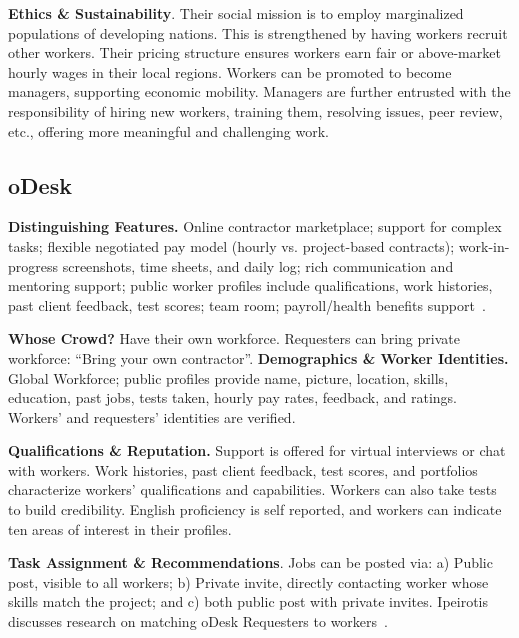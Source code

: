 \documentclass{sigchi}
\begin{document}
{\bf Ethics \& Sustainability}. Their social mission is to employ marginalized populations of developing nations. This is strengthened by having workers recruit other workers. Their pricing structure ensures workers earn fair or above-market hourly wages in their local regions. Workers can be promoted to become managers, supporting economic mobility. Managers are further entrusted with the responsibility of hiring new workers, training them, resolving issues, peer review, etc., offering more meaningful and challenging work.

\subsection{oDesk} 

{\bf Distinguishing Features.} Online contractor marketplace; support for complex tasks; flexible negotiated pay model (hourly vs. project-based contracts); work-in-progress screenshots, time sheets, and daily log; rich communication and mentoring support; public worker profiles include qualifications, work histories, past client feedback, test scores; team room; payroll/health benefits support~\cite{Ipeirotis-odesk}.

{\bf Whose Crowd?} Have their own workforce. Requesters can bring private workforce: ``Bring your own contractor''.
{\bf Demographics \& Worker Identities.} Global Workforce; public profiles provide name, picture, location, skills, education, past jobs, tests taken, hourly pay rates, feedback, and ratings. Workers' and requesters' identities are verified. 

{\bf Qualifications \& Reputation.} Support is offered for virtual interviews or chat with workers. Work histories, past client feedback, test scores, and portfolios characterize workers' qualifications and capabilities. Workers can also take tests to build credibility. English proficiency is self reported, and workers can indicate ten areas of interest in their profiles.

{\bf Task Assignment \& Recommendations}. Jobs can be posted via: a) Public post, visible to all workers; b) Private invite, directly contacting worker whose skills match the project; and c) both public post with private invites. Ipeirotis discusses research on matching oDesk Requesters to workers~\cite{ipeirotis-odesk-slides}.
\end{document}
